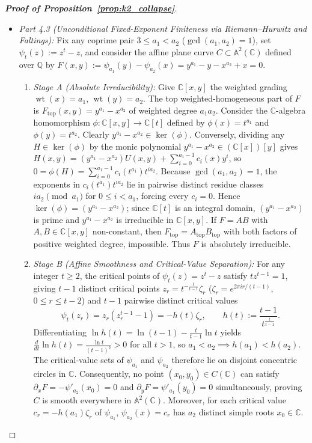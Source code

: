 \documentclass[11pt,a4paper]{article}
\theoremstyle{definition}
\begin{document}
\begin{proof}[\textbf{Proof of Proposition~\ref{prop:k2_collapse}}]
\begin{enumerate}
\begin{itemize}
        \item \emph{Part 4.3 (Unconditional Fixed-Exponent Finiteness via Riemann--Hurwitz and Faltings):} Fix any coprime pair $3 \le a_1 < a_2$ ($\gcd(a_1, a_2) = 1$), set $\psi_t(z) := z^t - z$, and consider the affine plane curve $C \subset \mathbb{A}^2(\mathbb{C})$ defined over $\mathbb{Q}$ by $F(x, y) := \psi_{a_1}(y) - \psi_{a_2}(x) = y^{a_1} - y - x^{a_2} + x = 0$.
        \begin{enumerate}
            \item[(a)] \emph{Stage A (Absolute Irreducibility):} Give $\mathbb{C}[x, y]$ the weighted grading $\operatorname{wt}(x) = a_1$, $\operatorname{wt}(y) = a_2$. The top weighted-homogeneous part of $F$ is $F_{\mathrm{top}}(x, y) = y^{a_1} - x^{a_2}$ of weighted degree $a_1 a_2$. Consider the $\mathbb{C}$-algebra homomorphism $\phi : \mathbb{C}[x, y] \to \mathbb{C}[t]$ defined by $\phi(x) = t^{a_1}$ and $\phi(y) = t^{a_2}$. Clearly $y^{a_1} - x^{a_2} \in \ker(\phi)$. Conversely, dividing any $H \in \ker(\phi)$ by the monic polynomial $y^{a_1} - x^{a_2} \in (\mathbb{C}[x])[y]$ gives $H(x, y) = (y^{a_1} - x^{a_2})U(x, y) + \sum_{i=0}^{a_1 - 1} c_i(x) y^i$, so $0 = \phi(H) = \sum_{i=0}^{a_1 - 1} c_i(t^{a_1}) t^{i a_2}$. Because $\gcd(a_1, a_2) = 1$, the exponents in $c_i(t^{a_1}) t^{i a_2}$ lie in pairwise distinct residue classes $i a_2 \pmod{a_1}$ for $0 \le i < a_1$, forcing every $c_i = 0$. Hence $\ker(\phi) = (y^{a_1} - x^{a_2})$; since $\mathbb{C}[t]$ is an integral domain, $(y^{a_1} - x^{a_2})$ is prime and $y^{a_1} - x^{a_2}$ is irreducible in $\mathbb{C}[x, y]$. If $F = A B$ with $A, B \in \mathbb{C}[x, y]$ non-constant, then $F_{\mathrm{top}} = A_{\mathrm{top}} B_{\mathrm{top}}$ with both factors of positive weighted degree, impossible. Thus $F$ is absolutely irreducible.

            \item[(b)] \emph{Stage B (Affine Smoothness and Critical-Value Separation):} For any integer $t \ge 2$, the critical points of $\psi_t(z) = z^t - z$ satisfy $t z^{t-1} = 1$, giving $t - 1$ distinct critical points $z_r = t^{-\frac{1}{t-1}}\zeta_r$ ($\zeta_r = e^{2\pi i r / (t-1)}$, $0 \le r \le t - 2$) and $t - 1$ pairwise distinct critical values
            \[
            \psi_t(z_r) = z_r(z_r^{t-1} - 1) = -h(t)\zeta_r, \qquad h(t) := \frac{t - 1}{t^{\frac{t}{t-1}}}.
            \]
            Differentiating $\ln h(t) = \ln(t - 1) - \frac{t}{t-1}\ln t$ yields $\frac{d}{dt}\ln h(t) = \frac{\ln t}{(t - 1)^2} > 0$ for all $t > 1$, so $a_1 < a_2 \implies h(a_1) < h(a_2)$. The critical-value sets of $\psi_{a_1}$ and $\psi_{a_2}$ therefore lie on disjoint concentric circles in $\mathbb{C}$. Consequently, no point $(x_0, y_0) \in C(\mathbb{C})$ can satisfy $\partial_x F = -\psi'_{a_2}(x_0) = 0$ and $\partial_y F = \psi'_{a_1}(y_0) = 0$ simultaneously, proving $C$ is smooth everywhere in $\mathbb{A}^2(\mathbb{C})$. Moreover, for each critical value $c_r = -h(a_1)\zeta_r$ of $\psi_{a_1}$, $\psi_{a_2}(x) = c_r$ has $a_2$ distinct simple roots $x_0 \in \mathbb{C}$.


\end{enumerate}
\end{itemize}
\end{enumerate}
\end{proof}
\end{document}
